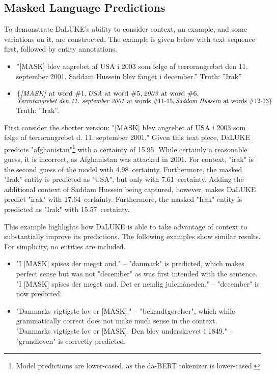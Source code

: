 \documentclass[main.tex]{subfiles}
\begin{document}
\subsection{Masked Language Predictions}
\label{subsec:mlmpreds}
To demonstrate DaLUKE's ability to consider context, an example, and some variations on it, are constructed.
The example is given below with text sequence first, followed by entity annotations.
\begin{itemize}
    \item ''[MASK] blev angrebet af USA i 2003 som følge af terrorangrebet den 11. september 2001. Saddam Hussein blev fanget i december.''
        \subitem Truth: ''Irak''
    \item $\{
            \text{\emph{[MASK]} at word \#1},
            \text{\emph{USA} at word \#5},
            \text{\emph{2003} at word \#6},
        $\\
        $
            \text{\emph{Terrorangrebet den 11. september 2001} at words \#11-15},
            \text{\emph{Saddam Hussein} at words \#12-13}
        \}$
        \subitem Truth: ''Irak''.
\end{itemize}
First consider the shorter version: "[MASK] blev angrebet af USA i 2003 som følge af terrorangrebet d. 11. september 2001."
Given this text piece, DaLUKE predicts "afghanistan"\footnote{Model predictions are lower-cased, as the da-BERT tokenizer is lower-cased.} with a certainty of 15.95\pro.
While certainly a reasonable guess, it is incorrect, as Afghanistan was attacked in 2001.
For context, "irak" is the second guess of the model with 4.98\pro\ certainty.
Furthermore, the masked "Irak" entity is predicted as "USA", but only with 7.61\pro~certainty.
Adding the additional context of Saddam Hussein being captured, however, makes DaLUKE predict "irak" with 17.64\pro~certainty.
Furthermore, the masked "Irak" entity is predicted as "Irak" with 15.57\pro~certainty.

This example highlights how DaLUKE is able to take advantage of context to substantially improve its predictions.
The following examples show similar results.
For simplicity, no entities are included.
\begin{itemize}
    \item "I [MASK] spises der meget and." -- "danmark" is predicted, which makes perfect sense but was not "december" as was first intended with the sentence.\\
    "I [MASK] spises der meget and. Det er nemlig julemåneden." -- "december" is now predicted.
    \item "Danmarks vigtigste lov er [MASK]." -- "bekendtgørelser", which while grammatically correct does not make much sense in the context.\\
    "Danmarks vigtigste lov er [MASK]. Den blev underskrevet i 1849." -- "grundloven" is correctly predicted.
\end{itemize}
\end{document}
